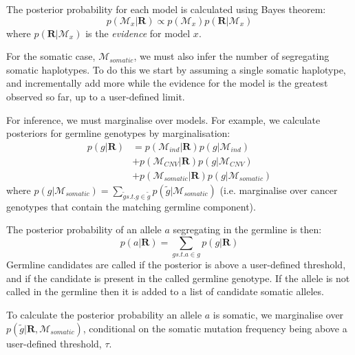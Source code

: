 \documentclass[notitlepage, twocolumn, 10pt]{article}
\begin{document}
The posterior probability for each model is calculated using Bayes theorem:
\begin{equation*}
    p(\mathcal{M}_{x} | \boldsymbol{R}) \propto p(\mathcal{M}_{x}) p(\boldsymbol{R} | \mathcal{M}_{x})  
\end{equation*}
where $p(\boldsymbol{R} | \mathcal{M}_{x})$ is the \emph{evidence} for model $x$.

For the somatic case, $\mathcal{M}_{somatic}$, we must also infer the number of segregating somatic haplotypes. To do this we start by assuming a single somatic haplotype, and incrementally add more while the evidence for the model is the greatest observed so far, up to a user-defined limit.

For inference, we must marginalise over models. For example, we calculate posteriors for germline genotypes by marginalisation:
\begin{align*}
p(g | \boldsymbol{R}) &= p(\mathcal{M}_{ind} | \boldsymbol{R}) p(g | \mathcal{M}_{ind}) \\
&+ p(\mathcal{M}_{CNV} | \boldsymbol{R}) p(g | \mathcal{M}_{CNV}) \\
&+ p(\mathcal{M}_{somatic} | \boldsymbol{R}) p(g | \mathcal{M}_{somatic})
\end{align*}
where $p(g | \mathcal{M}_{somatic}) = \sum_{\tilde{g} s.t. g \in \tilde{g}} p(\tilde{g} | \mathcal{M}_{somatic})$ (i.e. marginalise over cancer genotypes that contain the matching germline component).

The posterior probability of an allele $a$ segregating in the germline is then:
\begin{equation*}
p(a | \boldsymbol{R}) = \sum_{g s.t. a \in g} p(g | \boldsymbol{R})
\end{equation*}
Germline candidates are called if the posterior is above a user-defined threshold, and if the candidate is present in the called germline genotype. If the allele is not called in the germline then it is added to a list of candidate somatic alleles.

To calculate the posterior probability an allele $a$ is somatic, we marginalise over $p(\tilde{g} | \boldsymbol{R}, \mathcal{M}_{somatic})$, conditional on the somatic mutation frequency being above a user-defined threshold, $\tau$.
\end{document}
